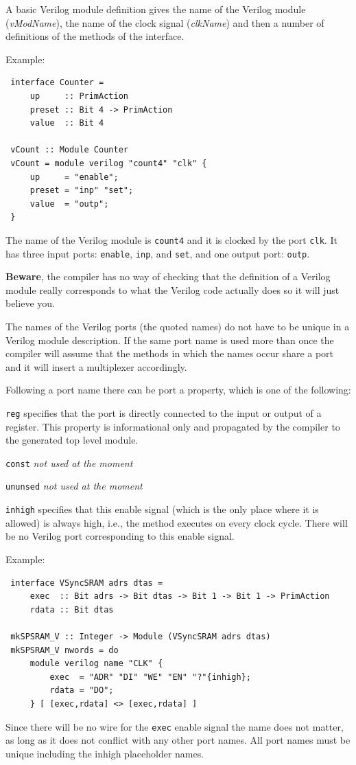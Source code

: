 \documentclass[twoside,letterpaper]{article}
\newcommand{\hm}{\hspace*{1em}}
\newcommand{\veri}{Verilog}
\newenvironment{NOTE}{%
  \hm{\bf{Note}}
  \begin{list}{$\bullet$}{%
    \setlength{\topsep}{0in}
    \setlength{\partopsep}{0in}
    \setlength{\itemsep}{0in}
    \setlength{\parsep}{0in}
    \setlength{\leftmargin}{2em}
    \setlength{\rightmargin}{0in}
    \setlength{\itemindent}{0in}
  }\item[]
  \sf
 }
 {\end{list}\hm{\bf{End of Note}}}
\newcommand{\te}[1]{\texttt{#1}}
\newcommand{\nterm}[1]{\emph{#1}}
\newcommand{\term}[1]{{\tt{#1}}}
\newcommand{\begindescrlist}[1]{
\begin{list}{\arabic{enumi}}{
                \settowidth{\labelwidth}{#1}
                \setlength{\leftmargin}{\labelwidth} %
                \addtolength{\leftmargin}{\labelsep}
                \setlength{\parsep}{0ex}
                \setlength{\itemsep}{0ex}
                \usecounter{enumi}
        }
}
\newcommand{\litem}[1]{\item[#1\hfill]}
\begin{document}
A basic {\veri} module definition gives the name of the {\veri} module
({\nterm{vModName}}), the name of the clock signal ({\nterm{clkName}})
and then a number of definitions of the methods of the interface.

Example:
\begin{verbatim}
 interface Counter =
     up     :: PrimAction
     preset :: Bit 4 -> PrimAction
     value  :: Bit 4

 vCount :: Module Counter
 vCount = module verilog "count4" "clk" {
     up     = "enable";
     preset = "inp" "set";
     value  = "outp";
 }
\end{verbatim}
The name of the {\veri} module is \te{count4} and it is clocked by the
port \te{clk}.  It has three input ports: \te{enable}, \te{inp}, and \te{set},
and one output port: \te{outp}.

{\bf Beware}, the compiler has no way of checking that the definition of
a {\veri} module really corresponds to what the {\veri} code actually does
so it will just believe you.

The names of the {\veri} ports (the quoted names) do not have to be unique
in a {\veri} module description.  If the same port name is used more than
once the compiler will assume that the methods in which the names occur
share a port and it will insert a multiplexer accordingly.

Following a port name there can be port a property,
which is one of the following:
\begindescrlist{xxxxxxx}
\litem{\te{reg}}
specifies that the port is directly connected
to the input or output of a register.  This property is informational only
and propagated by the compiler to the generated top level module.
\litem{\te{const}}
{\em not used at the moment}
\litem{\te{ununsed}}
{\em not used at the moment}
\litem{\te{inhigh}}
specifies that this enable signal (which is the only place where it is allowed) is always
high, i.e., the method executes on every clock cycle.  There will be no {\veri} port corresponding
to this enable signal.
\end{list}


Example:
\begin{verbatim}
 interface VSyncSRAM adrs dtas =
     exec  :: Bit adrs -> Bit dtas -> Bit 1 -> Bit 1 -> PrimAction
     rdata :: Bit dtas

 mkSPSRAM_V :: Integer -> Module (VSyncSRAM adrs dtas)
 mkSPSRAM_V nwords = do
     module verilog name "CLK" {
         exec  = "ADR" "DI" "WE" "EN" "?"{inhigh};
         rdata = "DO";
     } [ [exec,rdata] <> [exec,rdata] ]
\end{verbatim}
Since there will be no wire for the \term{exec} enable signal the name
does not matter, as long as it does not conflict with any other port names.
All port names must be unique including the inhigh placeholder names.
\end{document}
